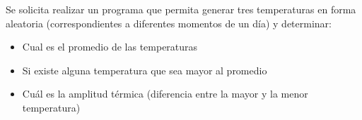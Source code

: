 Se solicita realizar un programa que permita generar tres temperaturas en forma aleatoria (correspondientes a diferentes momentos de un día) y determinar:

\begin{itemize}
	\item Cual es el promedio de las temperaturas
	\item Si existe alguna temperatura que sea mayor al promedio
	\item Cuál es la amplitud térmica (diferencia entre la mayor y la menor temperatura)
\end{itemize}
